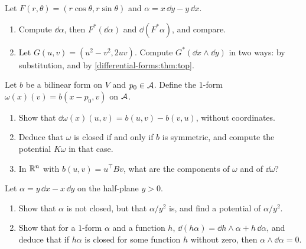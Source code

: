 \begin{notechapter}
\begin{exercise}\label{differential-forms:exr:2}
Let $F(r, \theta) = (r\cos\theta, r\sin\theta)$ and
$\alpha = x\,\dd y - y\,\dd x$.
\begin{enumerate}[nosep]
  \item Compute $\dd\alpha$, then $F^*(\dd\alpha)$ and
        $\dd(F^*\alpha)$, and compare.
  \item Let $G(u, v) = (u^2 - v^2, 2uv)$. Compute $G^*(\dd x\wedge\dd y)$
        in two ways: by substitution, and by
        \cref{differential-forms:thm:top}.
\end{enumerate}
\end{exercise}

\begin{exercise}\label{differential-forms:exr:3}
Let $b$ be a bilinear form on $V$ and $p_0\in\mathcal{A}$. Define the $1$-form
$\omega(x)(v) = b(x - p_0, v)$ on $\mathcal{A}$.
\begin{enumerate}[nosep]
  \item Show that $\dd\omega(x)(u, v) = b(u, v) - b(v, u)$, without
        coordinates.
  \item Deduce that $\omega$ is closed if and only if $b$ is symmetric,
        and compute the potential $K\omega$ in that case.
  \item In $\mathbb{R}^n$ with $b(u, v) = u^\top Bv$, what are the components
        of $\omega$ and of $\dd\omega$?
\end{enumerate}
\end{exercise}

\begin{exercise}\label{differential-forms:exr:4}
Let $\alpha = y\,\dd x - x\,\dd y$ on the half-plane $y > 0$.
\begin{enumerate}[nosep]
  \item Show that $\alpha$ is not closed, but that $\alpha/y^2$ is, and
        find a potential of $\alpha/y^2$.
  \item Show that for a $1$-form $\alpha$ and a function $h$,
        $\dd(h\alpha) = \dd h\wedge\alpha + h\,\dd\alpha$, and deduce
        that if $h\alpha$ is closed for some function $h$ without
        zero, then $\alpha\wedge\dd\alpha = 0$.
\end{enumerate}
\end{exercise}


\end{notechapter}
